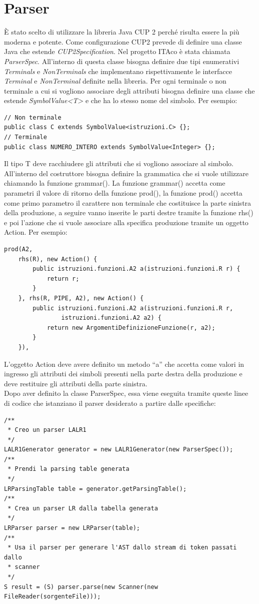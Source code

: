 \documentclass[11pt, a4paper, twoside, notitlepage]{report}
\begin{document}
\section{Parser}
È stato scelto di utilizzare la libreria Java CUP 2 perché risulta essere la più
moderna e potente. Come configurazione CUP2 prevede di definire una classe Java
che estende \emph{CUP2Specification}. Nel progetto ITAco è stata chiamata
\emph{ParserSpec}. All'interno di questa classe bisogna definire due tipi
enumerativi \emph{Terminals} e \emph{NonTerminals} che implementano
rispettivamente le interfacce \emph{Terminal} e \emph{NonTerminal} definite
nella libreria.
Per ogni terminale o non terminale a cui si vogliono associare degli attributi
bisogna definire una classe che estende \emph{SymbolValue<T>} e che ha lo stesso
nome del simbolo. Per esempio:
\begin{verbatim}
// Non terminale
public class C extends SymbolValue<istruzioni.C> {};
// Terminale
public class NUMERO_INTERO extends SymbolValue<Integer> {};
\end{verbatim}
Il tipo T deve racchiudere gli attributi che si vogliono associare al simbolo.
All'interno del costruttore bisogna definire la grammatica che si vuole
utilizzare chiamando la funzione grammar(). La funzione grammar() accetta come
parametri il valore di ritorno della funzione prod(), la funzione prod() accetta
come primo parametro il carattere non terminale che costituisce la parte
sinistra della produzione, a seguire vanno inserite le parti destre tramite la
funzione rhs() e poi l'azione che si vuole associare alla specifica produzione
tramite un oggetto Action. Per esempio:
\begin{verbatim}
prod(A2,
	rhs(R), new Action() {
		public istruzioni.funzioni.A2 a(istruzioni.funzioni.R r) {
			return r;
		}
	}, rhs(R, PIPE, A2), new Action() {
		public istruzioni.funzioni.A2 a(istruzioni.funzioni.R r,
				istruzioni.funzioni.A2 a2) {
			return new ArgomentiDefinizioneFunzione(r, a2);
		}
	}),
\end{verbatim}

L'oggetto Action deve avere definito un metodo ``a'' che accetta come valori in
ingresso gli attributi dei simboli presenti nella parte destra della produzione
e deve restituire gli attributi della parte sinistra.
\\Dopo aver definito la classe ParserSpec, essa viene eseguita tramite queste
linee di codice che istanziano il parser desiderato a partire dalle specifiche:
\begin{verbatim}
/**
 * Creo un parser LALR1
 */
LALR1Generator generator = new LALR1Generator(new ParserSpec());
/**
 * Prendi la parsing table generata
 */
LRParsingTable table = generator.getParsingTable();
/**
 * Crea un parser LR dalla tabella generata
 */
LRParser parser = new LRParser(table);
/**
 * Usa il parser per generare l'AST dallo stream di token passati dallo
 * scanner
 */
S result = (S) parser.parse(new Scanner(new FileReader(sorgenteFile)));
\end{verbatim}
\end{document}
